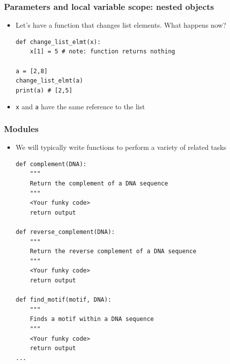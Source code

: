 \documentclass[xcolor=table]{beamer}
\begin{document}
\begin{frame}[fragile]
\frametitle{Parameters and local variable scope: nested objects}
\begin{itemize}
    \item Let's have a function that changes list elements. What happens now?
\begin{lstlisting}[style=python]
def change_list_elmt(x):  
    x[1] = 5 # note: function returns nothing

a = [2,8]
change_list_elmt(a)
print(a) # [2,5]
\end{lstlisting}
   \item \texttt{x} and \texttt{a} have the same reference to the list
    \end{itemize}
\end{frame}
\begin{frame}[fragile]
\frametitle{Modules}

\begin{itemize}
	\item We will typically write functions to perform a variety of related
	tasks

\begin{lstlisting}[style=python]
def complement(DNA):
    """
    Return the complement of a DNA sequence 
    """
    <Your funky code>
    return output

def reverse_complement(DNA):
    """
    Return the reverse complement of a DNA sequence 
    """
    <Your funky code>
    return output 

def find_motif(motif, DNA):
    """
    Finds a motif within a DNA sequence 
    """
    <Your funky code>
    return output 
...
\end{lstlisting}

\end{itemize}
\end{frame}
\end{document}
